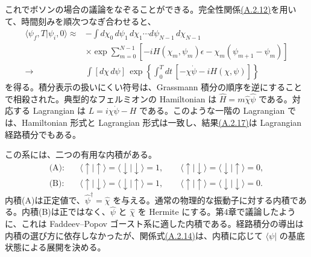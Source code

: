 これでボソンの場合の議論をなぞることができる。完全性関係\hyperref[eq:A.2.12]{(A.2.12)}を用いて、時間刻みを順次つなぎ合わせると、
\begin{equation}
\begin{aligned}
\langle\psi_f,T|\psi_i,0\rangle
\approx{}&-\int d\chi_0\,d\psi_1\,d\chi_1\cdots
d\psi_{N-1}\,d\chi_{N-1}\\
&\times\exp\sum_{m=0}^{N-1}
[-iH(\chi_m,\psi_m)\epsilon-\chi_m(\psi_{m+1}-\psi_m)]\\
\longrightarrow{}&\int[d\chi\,d\psi]\,
\exp\left\{\int_0^Tdt\,[-\chi\dot\psi-iH(\chi,\psi)]\right\}
\end{aligned}
\tag{A.2.17}\label{eq:A.2.17}
\end{equation}
を得る。積分表示の扱いにくい符号は、Grassmann 積分の順序を逆にすることで相殺された。典型的なフェルミオンの Hamiltonian は $\hat H=m\hat\chi\hat\psi$ である。対応する Lagrangian は $L=i\chi\dot\psi-H$ である。このような一階の Lagrangian では、Hamiltonian 形式と Lagrangian 形式は一致し、結果\hyperref[eq:A.2.17]{(A.2.17)}は Lagrangian 経路積分でもある。

この系には、二つの有用な内積がある。
\begin{align}
\text{(A)}:\quad
&\langle\uparrow|\uparrow\rangle
=\langle\downarrow|\downarrow\rangle=1,\qquad
\langle\uparrow|\downarrow\rangle
=\langle\downarrow|\uparrow\rangle=0,
\tag{A.2.18a}\label{eq:A.2.18a}\\
\text{(B)}:\quad
&\langle\uparrow|\downarrow\rangle
=\langle\downarrow|\uparrow\rangle=1,\qquad
\langle\uparrow|\uparrow\rangle
=\langle\downarrow|\downarrow\rangle=0.
\tag{A.2.18b}\label{eq:A.2.18b}
\end{align}
内積(A)は正定値で、$\hat\psi^\dagger=\hat\chi$ を与える。通常の物理的な振動子に対する内積である。内積(B)は正ではなく、$\hat\psi$ と $\hat\chi$ を Hermite にする。第4章で議論したように、これは Faddeev--Popov ゴースト系に適した内積である。経路積分の導出は内積の選び方に依存しなかったが、関係式\hyperref[eq:A.2.14]{(A.2.14)}は、内積に応じて $\langle\psi|$ の基底状態による展開を決める。

